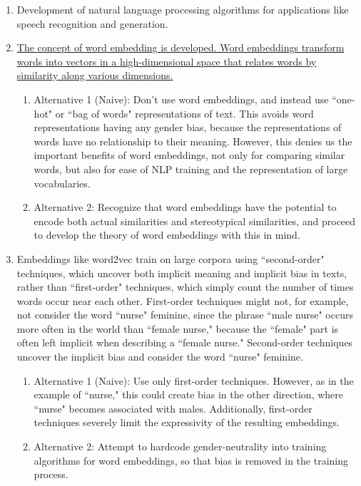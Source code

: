 \documentclass[submit]{harvardml}
\begin{document}
\begin{enumerate}
	\item Development of natural language processing algorithms for applications like speech recognition and generation.

	\item \ul{The concept of word embedding is developed. Word embeddings transform words into vectors in a high-dimensional space that relates words by similarity along various dimensions.}
	
		\begin{enumerate}
			\item Alternative 1 (Naive): Don't use word embeddings, and instead use ``one-hot" or ``bag of words" representations of text. This avoids word representations having any gender bias, because the representations of words have no relationship to their meaning. However, this denies us the important benefits of word embeddings, not only for comparing similar words, but also for ease of NLP training and the representation of large vocabularies.
			\item Alternative 2: Recognize that word embeddings have the potential to encode both actual similarities and stereotypical similarities, and proceed to develop the theory of word embeddings with this in mind.
		\end{enumerate}
	
	\item Embeddings like word2vec train on large corpora using ``second-order" techniques, which uncover both implicit meaning and implicit bias in texts, rather than ``first-order" techniques, which simply count the number of times words occur near each other. First-order techniques might not, for example, not consider the word ``nurse" feminine, since the phrase ``male nurse" occurs more often in the world than ``female nurse," because the ``female" part is often left implicit when describing a ``female nurse." Second-order techniques uncover the implicit bias and consider the word ``nurse" feminine.
		\begin{enumerate}
			\item Alternative 1 (Naive): Use only first-order techniques. However, as in the example of ``nurse," this could create bias in the other direction, where ``nurse" becomes associated with males. Additionally, first-order techniques severely limit the expressivity of the resulting embeddings.
			\item Alternative 2: Attempt to hardcode gender-neutrality into training algorithms for word embeddings, so that bias is removed in the training process.
		\end{enumerate}
	

\end{enumerate}
\end{document}
